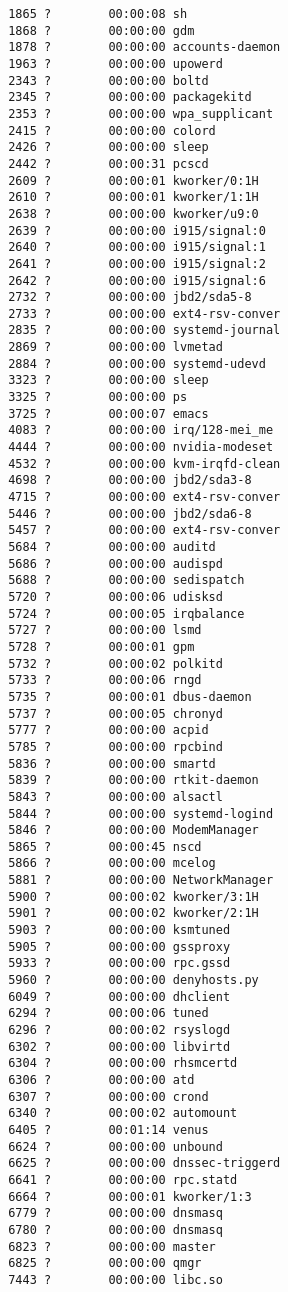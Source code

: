 \documentclass[a4paper]{article}
\begin{document}
\begin{figure}
\begin{verbatim}
 1865 ?        00:00:08 sh
 1868 ?        00:00:00 gdm
 1878 ?        00:00:00 accounts-daemon
 1963 ?        00:00:00 upowerd
 2343 ?        00:00:00 boltd
 2345 ?        00:00:00 packagekitd
 2353 ?        00:00:00 wpa_supplicant
 2415 ?        00:00:00 colord
 2426 ?        00:00:00 sleep
 2442 ?        00:00:31 pcscd
 2609 ?        00:00:01 kworker/0:1H
 2610 ?        00:00:01 kworker/1:1H
 2638 ?        00:00:00 kworker/u9:0
 2639 ?        00:00:00 i915/signal:0
 2640 ?        00:00:00 i915/signal:1
 2641 ?        00:00:00 i915/signal:2
 2642 ?        00:00:00 i915/signal:6
 2732 ?        00:00:00 jbd2/sda5-8
 2733 ?        00:00:00 ext4-rsv-conver
 2835 ?        00:00:00 systemd-journal
 2869 ?        00:00:00 lvmetad
 2884 ?        00:00:00 systemd-udevd
 3323 ?        00:00:00 sleep
 3325 ?        00:00:00 ps
 3725 ?        00:00:07 emacs
 4083 ?        00:00:00 irq/128-mei_me
 4444 ?        00:00:00 nvidia-modeset
 4532 ?        00:00:00 kvm-irqfd-clean
 4698 ?        00:00:00 jbd2/sda3-8
 4715 ?        00:00:00 ext4-rsv-conver
 5446 ?        00:00:00 jbd2/sda6-8
 5457 ?        00:00:00 ext4-rsv-conver
 5684 ?        00:00:00 auditd
 5686 ?        00:00:00 audispd
 5688 ?        00:00:00 sedispatch
 5720 ?        00:00:06 udisksd
 5724 ?        00:00:05 irqbalance
 5727 ?        00:00:00 lsmd
 5728 ?        00:00:01 gpm
 5732 ?        00:00:02 polkitd
 5733 ?        00:00:06 rngd
 5735 ?        00:00:01 dbus-daemon
 5737 ?        00:00:05 chronyd
 5777 ?        00:00:00 acpid
 5785 ?        00:00:00 rpcbind
 5836 ?        00:00:00 smartd
 5839 ?        00:00:00 rtkit-daemon
 5843 ?        00:00:00 alsactl
 5844 ?        00:00:00 systemd-logind
 5846 ?        00:00:00 ModemManager
 5865 ?        00:00:45 nscd
 5866 ?        00:00:00 mcelog
 5881 ?        00:00:00 NetworkManager
 5900 ?        00:00:02 kworker/3:1H
 5901 ?        00:00:02 kworker/2:1H
 5903 ?        00:00:00 ksmtuned
 5905 ?        00:00:00 gssproxy
 5933 ?        00:00:00 rpc.gssd
 5960 ?        00:00:00 denyhosts.py
 6049 ?        00:00:00 dhclient
 6294 ?        00:00:06 tuned
 6296 ?        00:00:02 rsyslogd
 6302 ?        00:00:00 libvirtd
 6304 ?        00:00:00 rhsmcertd
 6306 ?        00:00:00 atd
 6307 ?        00:00:00 crond
 6340 ?        00:00:02 automount
 6405 ?        00:01:14 venus
 6624 ?        00:00:00 unbound
 6625 ?        00:00:00 dnssec-triggerd
 6641 ?        00:00:00 rpc.statd
 6664 ?        00:00:01 kworker/1:3
 6779 ?        00:00:00 dnsmasq
 6780 ?        00:00:00 dnsmasq
 6823 ?        00:00:00 master
 6825 ?        00:00:00 qmgr
 7443 ?        00:00:00 libc.so

\end{verbatim}
\end{figure}
\end{document}
